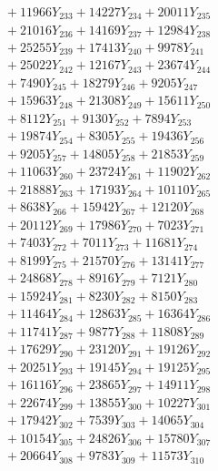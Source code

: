 \documentclass[a4paper,10pt]{article}
\begin{document}
{\begin{align}
&\;  + 11966 Y_{233} + 14227 Y_{234} + 20011 Y_{235} \\[0.3ex]
&\;  + 21016 Y_{236} + 14169 Y_{237} + 12984 Y_{238} \\[0.5ex]\allowbreak
&\;  + 25255 Y_{239} + 17413 Y_{240} + 9978 Y_{241} \\[0.3ex]
&\;  + 25022 Y_{242} + 12167 Y_{243} + 23674 Y_{244} \\[0.3ex]
&\;  + 7490 Y_{245} + 18279 Y_{246} + 9205 Y_{247} \\[0.3ex]
&\;  + 15963 Y_{248} + 21308 Y_{249} + 15611 Y_{250} \\[0.3ex]
&\;  + 8112 Y_{251} + 9130 Y_{252} + 7894 Y_{253} \\[0.3ex]
&\;  + 19874 Y_{254} + 8305 Y_{255} + 19436 Y_{256} \\[0.3ex]
&\;  + 9205 Y_{257} + 14805 Y_{258} + 21853 Y_{259} \\[0.3ex]
&\;  + 11063 Y_{260} + 23724 Y_{261} + 11902 Y_{262} \\[0.3ex]
&\;  + 21888 Y_{263} + 17193 Y_{264} + 10110 Y_{265} \\[0.3ex]
&\;  + 8638 Y_{266} + 15942 Y_{267} + 12120 Y_{268} \\[0.5ex]\allowbreak
&\;  + 20112 Y_{269} + 17986 Y_{270} + 7023 Y_{271} \\[0.3ex]
&\;  + 7403 Y_{272} + 7011 Y_{273} + 11681 Y_{274} \\[0.3ex]
&\;  + 8199 Y_{275} + 21570 Y_{276} + 13141 Y_{277} \\[0.3ex]
&\;  + 24868 Y_{278} + 8916 Y_{279} + 7121 Y_{280} \\[0.3ex]
&\;  + 15924 Y_{281} + 8230 Y_{282} + 8150 Y_{283} \\[0.3ex]
&\;  + 11464 Y_{284} + 12863 Y_{285} + 16364 Y_{286} \\[0.3ex]
&\;  + 11741 Y_{287} + 9877 Y_{288} + 11808 Y_{289} \\[0.3ex]
&\;  + 17629 Y_{290} + 23120 Y_{291} + 19126 Y_{292} \\[0.3ex]
&\;  + 20251 Y_{293} + 19145 Y_{294} + 19125 Y_{295} \\[0.3ex]
&\;  + 16116 Y_{296} + 23865 Y_{297} + 14911 Y_{298} \\[0.5ex]\allowbreak
&\;  + 22674 Y_{299} + 13855 Y_{300} + 10227 Y_{301} \\[0.3ex]
&\;  + 17942 Y_{302} + 7539 Y_{303} + 14065 Y_{304} \\[0.3ex]
&\;  + 10154 Y_{305} + 24826 Y_{306} + 15780 Y_{307} \\[0.3ex]
&\;  + 20664 Y_{308} + 9783 Y_{309} + 11573 Y_{310} \\[0.3ex]

\end{align}}
\end{document}
